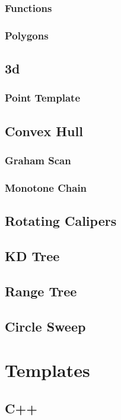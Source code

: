 \documentclass[10pt,a4paper]{report}
\begin{document}
		\subsection{Functions}
			
		\newpage
		\subsection{Polygons}
			
	\section{3d}
		\subsection{Point Template}
			
	\section{Convex Hull}
		\subsection{Graham Scan}
		\subsection{Monotone Chain}
	\section{Rotating Calipers}
	\section{KD Tree}
	\section{Range Tree}
	\section{Circle Sweep}

\chapter{Templates}
	\section{C++}
		
\end{document}

